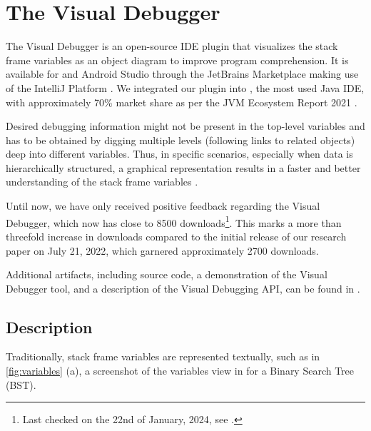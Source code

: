 \documentclass[sigconf]{acmart}
\begin{document}
\section{The Visual Debugger} \label{sec:visualDebugger}

The Visual Debugger is an open-source IDE plugin that visualizes the stack frame variables as an object diagram to improve program comprehension.
It is available for \intellij{} and Android Studio through the JetBrains Marketplace \cite{timkrauterVisualDebuggerIntelliJ2024, timkrauterVisualDebuggerTool2023} making use of the IntelliJ Platform \cite{kurbatovaIntelliJPlatformFramework2021}.
We integrated our plugin into \intellij{}, the most used Java IDE, with approximately 70\% market share as per the JVM Ecosystem Report 2021 \cite{brianvermeerJVMEcosystemReport2021}.

Desired debugging information might not be present in the top-level variables and has to be obtained by digging multiple levels (following links to related objects) deep into different variables.
Thus, in specific scenarios, especially when data is hierarchically structured, a graphical representation results in a faster and better understanding of the stack frame variables \cite{krauterVisualDebuggerTool2022}.

Until now, we have only received positive feedback regarding the Visual Debugger, which now has close to 8500 downloads\footnote{Last checked on the 22nd of January, 2024, see \cite{timkrauterVisualDebuggerIntelliJ2024}.}.
This marks a more than threefold increase in downloads compared to the initial release of our research paper \cite{krauterVisualDebuggerTool2022} on July 21, 2022, which garnered approximately 2700 downloads.

Additional artifacts, including source code, a demonstration of the Visual Debugger tool, and a description of the Visual Debugging API, can be found in \cite{timkrauterICSE2024Artifacts2024}.

\subsection{Description}

Traditionally, stack frame variables are represented textually, such as in \autoref{fig:variables} (a), a screenshot of the variables view in \intellij{} for a Binary Search Tree (BST).
\end{document}
